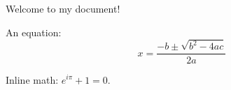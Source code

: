 \documentclass{article}
\begin{document}
Welcome to my document!

An equation:
\[
x = \frac{-b \pm \sqrt{b^2 - 4ac}}{2a}
\]

Inline math: \( e^{i\pi} + 1 = 0 \).
\end{document}
